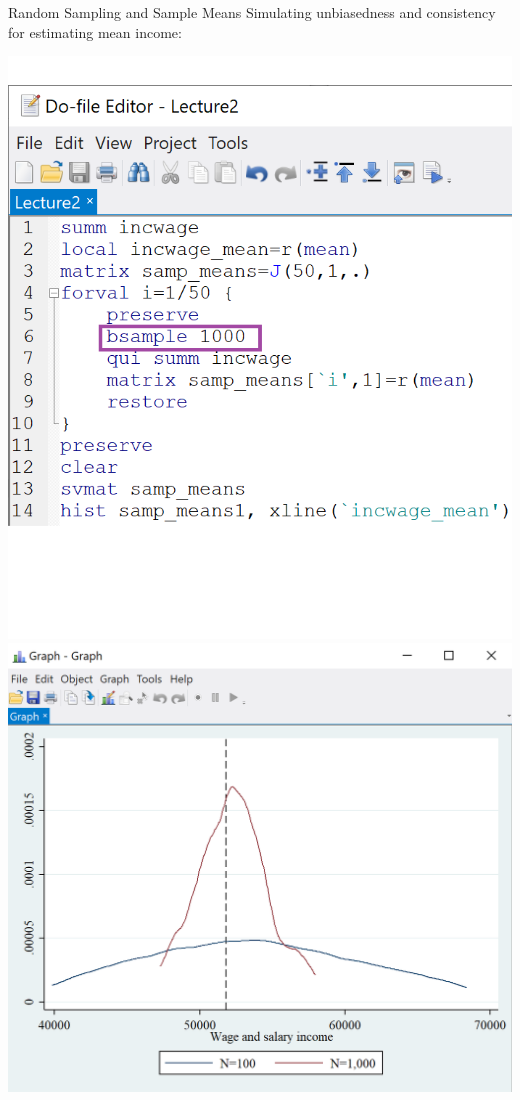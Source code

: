 \documentclass[11pt,english,handout]{beamer}
\begin{document}
\begin{frame}{Random Sampling and Sample Means}
\vspace{0.2cm}
Simulating unbiasedness and consistency for estimating mean income:

\begin{center}
\includegraphics[scale=0.45]{stata18b.png} \includegraphics[scale=0.5]{stata23.png}
\end{center}

\end{frame}
\end{document}
